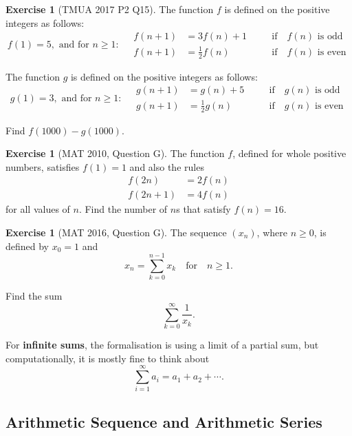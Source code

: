 \documentclass[11pt]{article}
\theoremstyle{definition}
\newtheorem{example}[theorem]{Exercise}
\theoremstyle{remark}
\newcommand{\pqty}[1]{\left(#1\right)}
\newcommand{\qif}{\quad\text{if}\quad}
\newcommand{\qfor}{\quad\text{for}\quad}
\begin{document}
\begin{example}[TMUA 2017 P2 Q15]\label{tmua-4-unit-004}
    The function \(f\) is defined on the positive integers as follows:
    \[
        f\pqty{1} = 5, \text{ and for } n \geq 1: \quad
        \begin{aligned}
            f\pqty{n + 1} &= 3 f\pqty{n} + 1 && \qif f\pqty{n} \text{ is odd} \\
            f\pqty{n + 1} &= \frac{1}{2} f\pqty{n} && \qif f\pqty{n} \text{ is even}
        \end{aligned}
    \]


    The function \(g\) is defined on the positive integers as follows:
    \[
        g\pqty{1} = 3, \text{ and for } n \geq 1: \quad
        \begin{aligned}
            g\pqty{n + 1} &= g\pqty{n} + 5 && \qif g\pqty{n} \text{ is odd} \\
            g\pqty{n + 1} &= \frac{1}{2} g\pqty{n} && \qif g\pqty{n} \text{ is even}
        \end{aligned}
    \]

    Find \(f\pqty{1000} - g\pqty{1000}\).
\end{example}

\begin{example}[MAT 2010, Question G]\label{tmua-4-unit-005}
    The function \(f\), defined for whole positive numbers, satisfies \(f\pqty{1} = 1\) and also the rules
    \begin{align*}
        f\pqty{2n} &= 2 f\pqty{n} \\
        f\pqty{2n + 1} &= 4 f\pqty{n}
    \end{align*}
    for all values of \(n\). Find the number of \(n\)s that satisfy \(f\pqty{n} = 16\).
\end{example}

\begin{example}[MAT 2016, Question G]\label{tmua-4-unit-006}
    The sequence \(\pqty{x_n}\), where \(n \geq 0\), is defined by \(x_0 = 1\) and
    \[
        x_n = \sum_{k = 0}^{n - 1} x_k \qfor n \geq 1.
    \]  

    Find the sum
    \[
        \sum_{k = 0}^{\infty} \frac{1}{x_k}.
    \]
\end{example}

For \textbf{infinite sums}, the formalisation is using a limit of a partial sum, but computationally, it is mostly fine to think about
\[
    \sum_{i = 1}^{\infty} a_i = a_1 + a_2 + \cdots.
\]

\subsection{Arithmetic Sequence and Arithmetic Series}\label{tmua-4-subsection-002}
\end{document}

